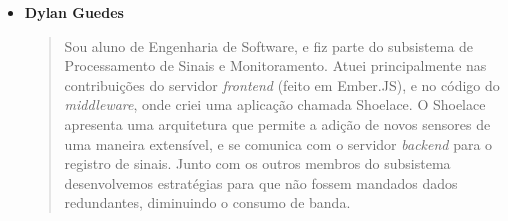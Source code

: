 \begin{itemize}
    \item \textbf{Dylan Guedes}
    \begin{quote}
        Sou aluno de Engenharia de Software, e fiz parte do subsistema de
        Processamento de Sinais e Monitoramento. Atuei principalmente nas
        contribuições do servidor \textit{frontend} (feito em Ember.JS), e
        no código do \textit{middleware}, onde criei uma aplicação chamada
        Shoelace. O Shoelace apresenta uma arquitetura que permite a adição de
        novos sensores de uma maneira extensível, e se comunica com o servidor
        \textit{backend} para o registro de sinais. Junto com os outros membros
        do subsistema desenvolvemos estratégias para que não fossem mandados
        dados redundantes, diminuindo o consumo de banda.
    \end{quote}
\end{itemize}
